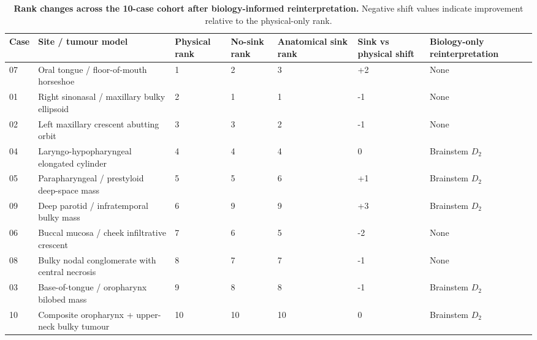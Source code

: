 \begin{table}[H]
\centering
\caption{\textbf{Rank changes across the 10-case cohort after biology-informed reinterpretation.} Negative shift values indicate improvement relative to the physical-only rank.}
\label{tab:rank_changes}
\scriptsize
\begin{tabular}{p{0.7cm}p{3.8cm}p{0.8cm}p{0.8cm}p{0.9cm}p{1.5cm}p{2.4cm}}
\toprule
Case & Site / tumour model & Physical rank & No-sink rank & Anatomical sink rank & Sink vs physical shift & Biology-only reinterpretation \\
\midrule
07 & Oral tongue / floor-of-mouth horseshoe & 1 & 2 & 3 & +2 & None \\
01 & Right sinonasal / maxillary bulky ellipsoid & 2 & 1 & 1 & -1 & None \\
02 & Left maxillary crescent abutting orbit & 3 & 3 & 2 & -1 & None \\
04 & Laryngo-hypopharyngeal elongated cylinder & 4 & 4 & 4 & 0 & Brainstem $D_{2}$ \\
05 & Parapharyngeal / prestyloid deep-space mass & 5 & 5 & 6 & +1 & Brainstem $D_{2}$ \\
09 & Deep parotid / infratemporal bulky mass & 6 & 9 & 9 & +3 & Brainstem $D_{2}$ \\
06 & Buccal mucosa / cheek infiltrative crescent & 7 & 6 & 5 & -2 & None \\
08 & Bulky nodal conglomerate with central necrosis & 8 & 7 & 7 & -1 & None \\
03 & Base-of-tongue / oropharynx bilobed mass & 9 & 8 & 8 & -1 & Brainstem $D_{2}$ \\
10 & Composite oropharynx + upper-neck bulky tumour & 10 & 10 & 10 & 0 & Brainstem $D_{2}$ \\
\bottomrule
\end{tabular}
\end{table}
